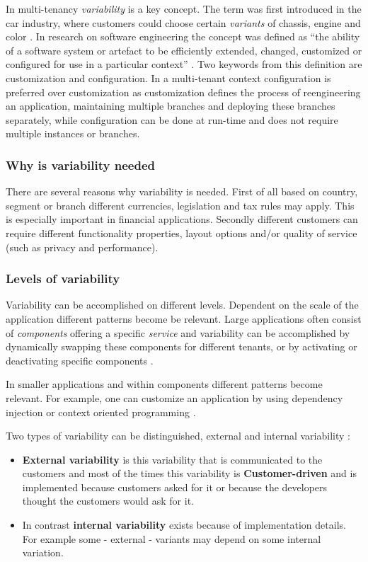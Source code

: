 In multi-tenancy \textit{variability} is a key concept. The term was first introduced in the car industry, where customers could choose certain \textit{variants} of chassis, engine and color \cite[p. 153]{kabbedijk2011variability}. 
In research on software engineering the concept was defined as ``the ability of a software system or artefact to be efficiently extended, changed, customized or configured for use in a particular context'' \cite{svahnberg2005taxonomy}.
Two keywords from this definition are customization and configuration. In a multi-tenant context configuration is preferred over customization \cite{sun2008software} as customization defines the process of reengineering an application, maintaining multiple branches and deploying these branches separately, while configuration can be done at run-time and does not require multiple instances or branches.

\subsubsection{Why is variability needed}
There are several reasons why variability is needed. 
First of all based on country, segment or branch different currencies, legislation and tax rules may apply. This is especially important in financial applications. 
Secondly different customers can require different functionality properties, layout options and/or quality of service (such as privacy and performance).

\subsubsection{Levels of variability}
Variability can be accomplished on different levels. 
Dependent on the scale of the application different patterns become be relevant. Large applications often consist of \textit{components} offering a specific \textit{service} and variability can be accomplished by dynamically swapping these components for different tenants, or by activating or deactivating specific components \cite{mietzner2008defining}. 

In smaller applications and within components different patterns become relevant. For example, one can customize an application by using dependency injection \cite{walraven2011middleware} or context oriented programming \cite{truyen2012context}.

Two types of variability can be distinguished, external and internal variability \cite{mietzner2009variability}:
 \begin{itemize}
\item \textbf{External variability} is this variability that is communicated to the customers and most of the times this variability is \textbf{Customer-driven} and is implemented because customers asked for it or because the developers thought the customers would ask for it. 
\item In contrast  \textbf{internal variability} exists because of implementation details. For example some - external - variants may depend on some internal variation.
\end{itemize}

